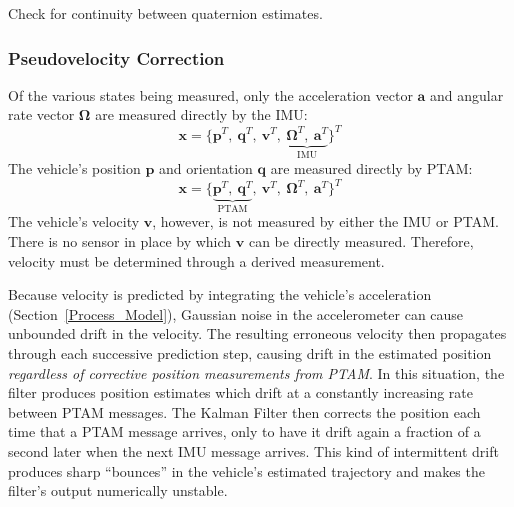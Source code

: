 \begin{algorithm}
  \caption{Check for continuity between quaternion estimates.}
    \label{alg:checkQuatContinuity}
\end{algorithm}

\subsubsection{Pseudovelocity Correction}

Of the various states being measured, only the acceleration vector $$ and angular rate vector $\bm{\Omega}$ are measured directly by the IMU:
%
\begin{equation*}
\mathbf{x} = 
\Big\{   
    \mathbf{p}^{T},\
    \mathbf{q}^{T},\
    \mathbf{v}^{T},\
    \underbrace{
    \bm{\Omega}^{T},\
    \mathbf{a}^{T}}_{\text{IMU}}
\Big\} ^{T}
\end{equation*}
%
The vehicle's position $$ and orientation $$ are measured directly by PTAM:
%
\begin{equation*}
\mathbf{x} = 
\Big\{
\underbrace{
    \mathbf{p}^{T},\
    \mathbf{q}^{T}}_{\text{PTAM}},\
    ^{T},\
    \bm{\Omega}^{T},\
    \mathbf{a}^{T}
\Big\} ^{T}
\end{equation*}
%
The vehicle's velocity $$, however, is not measured by either the IMU or PTAM. There is no sensor in place by which $\mathbf{v}$ can be directly measured. Therefore, velocity must be determined through a derived measurement.

Because velocity is predicted by integrating the vehicle's acceleration (Section~\ref{Process_Model}), Gaussian noise in the accelerometer can cause unbounded drift in the velocity. The resulting erroneous velocity then propagates through each successive prediction step, causing drift in the estimated position \textit{regardless of corrective position measurements from PTAM}. In this situation, the filter produces position estimates which drift at a constantly increasing rate between PTAM messages. The Kalman Filter then corrects the position each time that a PTAM message arrives, only to have it drift again a fraction of a second later when the next IMU message arrives. This kind of intermittent drift produces sharp ``bounces'' in the vehicle's estimated trajectory and makes the filter's output numerically unstable.

